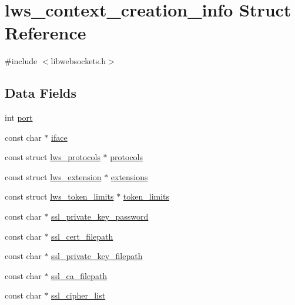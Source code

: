 \hypertarget{structlws__context__creation__info}{}\section{lws\+\_\+context\+\_\+creation\+\_\+info Struct Reference}
\label{structlws__context__creation__info}


{\ttfamily \#include $<$libwebsockets.\+h$>$}

\subsection*{Data Fields}
\begin{DoxyCompactItemize}
\item 
int \hyperlink{structlws__context__creation__info_a424a5ce268d6903e42243be94487ab85}{port}
\item 
const char $\ast$ \hyperlink{structlws__context__creation__info_a75434932bb5df54665ea678eb8ac104a}{iface}
\item 
const struct \hyperlink{structlws__protocols}{lws\+\_\+protocols} $\ast$ \hyperlink{structlws__context__creation__info_abb90ffb3e6d6db2db20f529d61bd9122}{protocols}
\item 
const struct \hyperlink{structlws__extension}{lws\+\_\+extension} $\ast$ \hyperlink{structlws__context__creation__info_a4a3d1155fc52f5048b481884f6fb947c}{extensions}
\item 
const struct \hyperlink{structlws__token__limits}{lws\+\_\+token\+\_\+limits} $\ast$ \hyperlink{structlws__context__creation__info_ac8a75b7b259a3c3a5fbb4219a3f06c29}{token\+\_\+limits}
\item 
const char $\ast$ \hyperlink{structlws__context__creation__info_af3fb447be15c4fcb01d3285a6678ab54}{ssl\+\_\+private\+\_\+key\+\_\+password}
\item 
const char $\ast$ \hyperlink{structlws__context__creation__info_ac62b0f0e8e402412ba5011d15c244103}{ssl\+\_\+cert\+\_\+filepath}
\item 
const char $\ast$ \hyperlink{structlws__context__creation__info_ab9ec8893e0f7843cf5d783d2f350ef14}{ssl\+\_\+private\+\_\+key\+\_\+filepath}
\item 
const char $\ast$ \hyperlink{structlws__context__creation__info_a4f8e65c3a059d3b586fafa9ef3282c29}{ssl\+\_\+ca\+\_\+filepath}
\item 
const char $\ast$ \hyperlink{structlws__context__creation__info_a3e1516fd7fed26bfa77c0246ed26c2eb}{ssl\+\_\+cipher\+\_\+list}

\end{DoxyCompactItemize}
